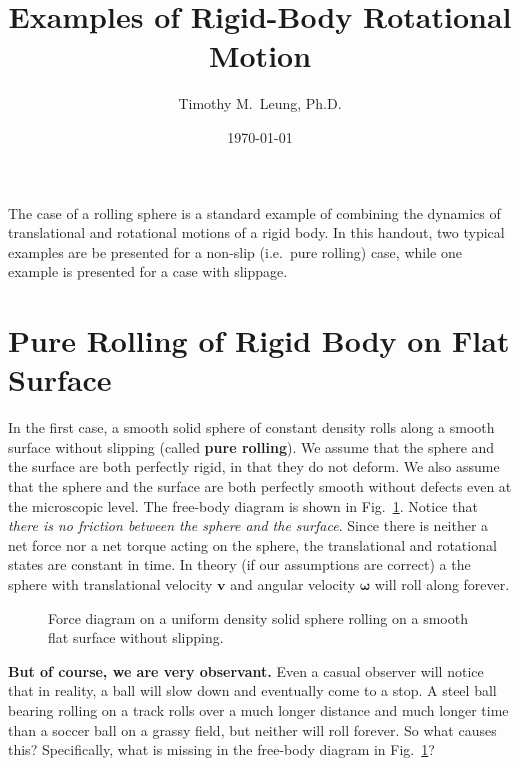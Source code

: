 \documentclass{../../../oss-handout}
\title{Examples of Rigid-Body Rotational Motion}
\author{Timothy M.\ Leung, Ph.D.}
\date{\today}
\newcommand{\mb}[1]{\mathbf{#1}}
\begin{document}
\thispagestyle{title}
\gentitle

The case of a rolling sphere is a standard example of combining the dynamics of
translational and rotational motions of a rigid body. In this handout, two
typical examples are be presented for a non-slip (i.e.\ pure rolling) case,
while one example is presented for a case with slippage.

\section{Pure Rolling of Rigid Body on Flat Surface}
\label{no-slip-ball}
In the first case, a smooth solid sphere of constant density rolls along a
smooth surface without slipping (called \textbf{pure rolling}). We assume that
the sphere and the surface are both perfectly rigid, in that they do not
deform. We also assume that the sphere and the surface are both
perfectly smooth without defects even at the microscopic level. The free-body
diagram is shown in Fig.~\ref{roll-flat}. Notice that
\emph{there is no friction between the sphere and the surface}. Since there is
neither a net force nor a net torque acting on the sphere, the translational
and rotational states are constant in time. In theory (if our assumptions are
correct) a the sphere with translational velocity $\mb{v}$ and angular velocity
$\bm\omega$ will roll along forever.
\begin{figure}[!ht]
  \centering
  \caption{Force diagram on a uniform density solid sphere rolling on a smooth
    flat surface without slipping.}
  \label{roll-flat}
\end{figure}

\textbf{But of course, we are very observant.} Even a casual observer will
notice that in reality, a ball will slow down and eventually come to a stop. A
steel ball bearing rolling on a track rolls over a much longer distance and
much longer time than a soccer ball on a grassy field, but neither will roll
forever. So what causes this? Specifically, what is missing in the free-body
diagram in Fig.~\ref{roll-flat}?
\end{document}
